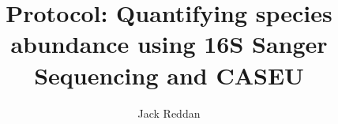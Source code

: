 \documentclass[a4paper]{article}
\begin{document}
\title{Protocol: Quantifying species abundance using 16S Sanger Sequencing and CASEU}
\author{Jack Reddan}
\date{}

\maketitle{}





\end{document}
